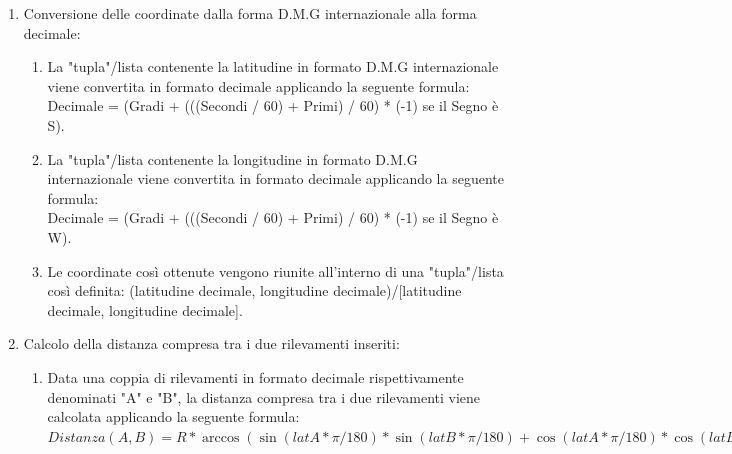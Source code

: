 \documentclass{article}
\begin{document}
\begin{enumerate}
	\item Conversione delle coordinate dalla forma D.M.G internazionale alla forma decimale:
	\begin{enumerate}
		\item La "tupla"/lista contenente la latitudine in formato D.M.G internazionale viene convertita in formato decimale applicando la seguente formula: \\Decimale = (Gradi + (((Secondi / 60) + Primi) / 60) * (-1) se il Segno è  S). 
		\item La "tupla"/lista contenente la longitudine in formato D.M.G internazionale viene convertita in formato decimale applicando la seguente formula: \\Decimale = (Gradi + (((Secondi / 60) + Primi) / 60) * (-1) se il Segno è  W).
		\item Le coordinate così ottenute vengono riunite all'interno di una "tupla"/lista così definita: (latitudine decimale, longitudine decimale)/[latitudine decimale, longitudine decimale].
	\end{enumerate}

	\item Calcolo della distanza compresa tra i due rilevamenti inseriti: 
	\begin{enumerate}
		\item Data una coppia di rilevamenti in formato decimale rispettivamente denominati "A" e "B", la distanza compresa tra i due rilevamenti viene calcolata applicando la seguente formula: \\$Distanza(A, B) = R * \arccos(\sin(latA * \pi / 180) * \sin(latB * \pi / 180) + \cos(latA * \pi / 180) * \cos(latB * \pi / 180) * \cos((lonA - lonB) * \pi / 180)). $
	\end{enumerate}


\end{enumerate}
\end{document}

